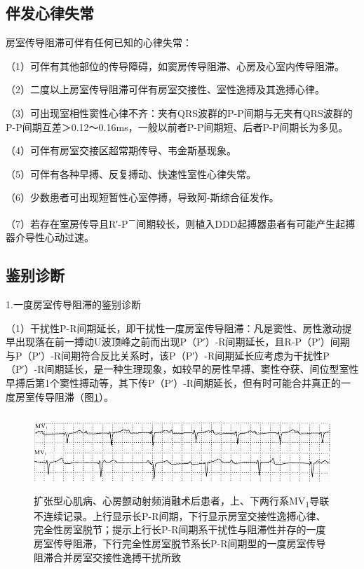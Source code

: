 \protect\hypertarget{text00027.htmlux5cux23subid329}{}{}

\subsection{伴发心律失常}

房室传导阻滞可伴有任何已知的心律失常：

（1）可伴有其他部位的传导障碍，如窦房传导阻滞、心房及心室内传导阻滞。

（2）二度以上房室传导阻滞可伴有房室交接性、室性逸搏及其逸搏心律。

（3）可出现室相性窦性心律不齐：夹有QRS波群的P-P间期与无夹有QRS波群的P-P间期互差＞0.12～0.16ms，一般以前者P-P间期短、后者P-P间期长为多见。

（4）可伴有房室交接区超常期传导、韦金斯基现象。

（5）可伴有各种早搏、反复搏动、快速性室性心律失常。

（6）少数患者可出现短暂性心室停搏，导致阿-斯综合征发作。

（7）若存在室房传导且R′-P\textsuperscript{－}间期较长，则植入DDD起搏器患者有可能产生起搏器介导性心动过速。

\protect\hypertarget{text00027.htmlux5cux23subid330}{}{}

\subsection{鉴别诊断}

1.一度房室传导阻滞的鉴别诊断

（1）干扰性P-R间期延长，即干扰性一度房室传导阻滞：凡是窦性、房性激动提早出现落在前一搏动U波顶峰之前而出现P（P′）-R间期延长，且R-P（P′）间期与P（P′）-R间期符合反比关系时，该P（P′）-R间期延长应考虑为干扰性P（P′）-R间期延长，是一种生理现象，如较早的房性早搏、窦性夺获、间位型室性早搏后第1个窦性搏动等，其下传P（P′）-R间期延长，但有时可能合并真正的一度房室传导阻滞（图\ref{fig20-13}）。

\begin{figure}[!htbp]
 \centering
 \includegraphics[width=5.58333in,height=1.14583in]{./images/Image00342.jpg}
 \captionsetup{justification=centering}
 \caption{扩张型心肌病、心房颤动射频消融术后患者，上、下两行系MV\textsubscript{1}导联不连续记录。上行显示长P-R间期，下行显示房室交接性逸搏心律、完全性房室脱节；提示上行长P-R间期系干扰性与阻滞性并存的一度房室传导阻滞，下行完全性房室脱节系长P-R间期型的一度房室传导阻滞合并房室交接性逸搏干扰所致}
 \label{fig20-13}
  \end{figure} 


